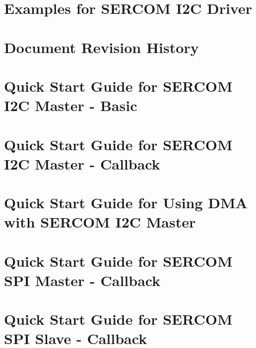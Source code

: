 \let\mypdfximage\pdfximage\def\pdfximage{\immediate\mypdfximage}\documentclass[twoside]{book}
\newcommand{\+}{\discretionary{\mbox{\scriptsize$\hookleftarrow$}}{}{}}
\begin{document}
\chapter{Examples for S\+E\+R\+C\+OM I2C Driver}
\label{asfdoc_sam0_sercom_i2c_exqsg}

\chapter{Document Revision History}
\label{asfdoc_sam0_sercom_i2c_document_revision_history}

\chapter{Quick Start Guide for S\+E\+R\+C\+OM I2C Master -\/ Basic}
\label{asfdoc_sam0_sercom_i2c_master_basic_use_case}

\chapter{Quick Start Guide for S\+E\+R\+C\+OM I2C Master -\/ Callback}
\label{asfdoc_sam0_sercom_i2c_master_callback_use_case}

\chapter{Quick Start Guide for Using D\+MA with S\+E\+R\+C\+OM I2C Master}
\label{asfdoc_sam0_sercom_i2c_master_dma_use_case}

\chapter{Quick Start Guide for S\+E\+R\+C\+OM S\+PI Master -\/ Callback}
\label{asfdoc_sam0_sercom_spi_master_callback_use}

\chapter{Quick Start Guide for S\+E\+R\+C\+OM S\+PI Slave -\/ Callback}
\label{asfdoc_sam0_sercom_spi_slave_callback_use}

\end{document}
